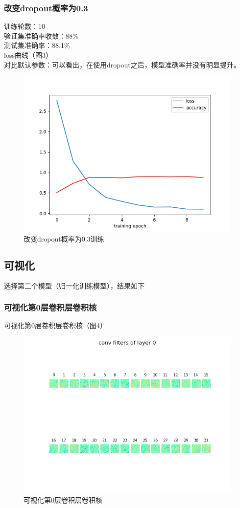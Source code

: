 \documentclass[a4paper]{article}
\begin{document}
\subsubsection{改变dropout概率为0.3}
训练轮数：10\\
验证集准确率收敛：88\%\\
测试集准确率：88.1\%\\
loss曲线（图3）\\
对比默认参数：可以看出，在使用dropout之后，模型准确率并没有明显提升。\\
\begin{figure}
    \centering
    \includegraphics[width=12cm]{Fig3.png}
    \caption{改变dropout概率为0.3训练}
\end{figure}

\subsection{可视化}
选择第二个模型（归一化训练模型），结果如下\\
\subsubsection{可视化第0层卷积层卷积核}
可视化第0层卷积层卷积核（图4）\\
\begin{figure}
    \centering
    \includegraphics[width=12cm]{Fig4.png}
    \caption{可视化第0层卷积层卷积核}
\end{figure}
\end{document}
